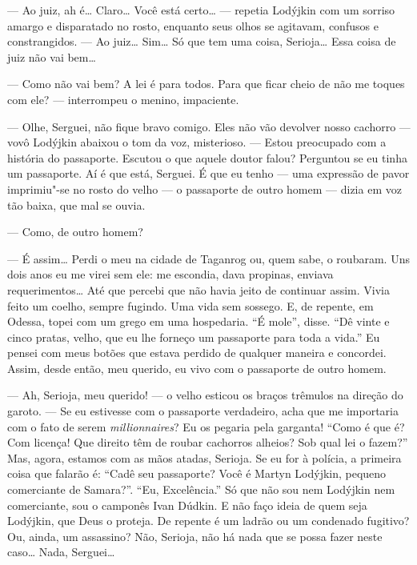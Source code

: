 --- Ao juiz, ah é\ldots{} Claro\ldots{} Você está certo\ldots{} --- repetia Lodýjkin
com um sorriso amargo e disparatado no rosto, enquanto seus olhos se
agitavam, confusos e constrangidos. --- Ao juiz\ldots{} Sim\ldots{} Só que tem uma
coisa, Serioja\ldots{} Essa coisa de juiz não vai bem\ldots{}

--- Como não vai bem? A lei é para todos. Para que ficar cheio de não me
toques com ele? --- interrompeu o menino, impaciente.

--- Olhe, Serguei, não fique bravo comigo. Eles não vão devolver nosso
cachorro --- vovô Lodýjkin abaixou o tom da voz, misterioso. --- Estou
preocupado com a história do passaporte. Escutou o que aquele doutor
falou? Perguntou se eu tinha um passaporte. Aí é que está, Serguei. É
que eu tenho --- uma expressão de pavor imprimiu"-se no rosto do velho
--- o passaporte de outro homem --- dizia em voz tão baixa, que mal se
ouvia.

--- Como, de outro homem?

--- É assim\ldots{} Perdi o meu na cidade de Taganrog ou, quem sabe, o
roubaram. Uns dois anos eu me virei sem ele: me escondia, dava propinas,
enviava requerimentos\ldots{} Até que percebi que não havia jeito de
continuar assim. Vivia feito um coelho, sempre fugindo. Uma vida sem
sossego. E, de repente, em Odessa, topei com um grego em uma hospedaria.
``É mole'', disse. ``Dê vinte e cinco pratas, velho, que eu lhe forneço
um passaporte para toda a vida.'' Eu pensei com meus botões que estava
perdido de qualquer maneira e concordei. Assim, desde então, meu
querido, eu vivo com o passaporte de outro homem.


--- Ah, Serioja, meu querido! --- o velho esticou os braços trêmulos na
direção do garoto. --- Se eu estivesse com o passaporte verdadeiro, acha
que me importaria com o fato de serem \emph{millionnaires}? Eu os pegaria
pela garganta! ``Como é que é? Com licença! Que direito têm de roubar
cachorros alheios? Sob qual lei o fazem?'' Mas, agora, estamos com as
mãos atadas, Serioja. Se eu for à polícia, a primeira coisa que falarão
é: ``Cadê seu passaporte? Você é Martyn Lodýjkin, pequeno comerciante de
Samara?''. ``Eu, Excelência.'' Só que não sou nem Lodýjkin nem
comerciante, sou o camponês Ivan Dúdkin. E não faço ideia de quem seja
Lodýjkin, que Deus o proteja. De repente é um ladrão ou um condenado
fugitivo? Ou, ainda, um assassino? Não, Serioja, não há nada que se
possa fazer neste caso\ldots{} Nada, Serguei\ldots{}

